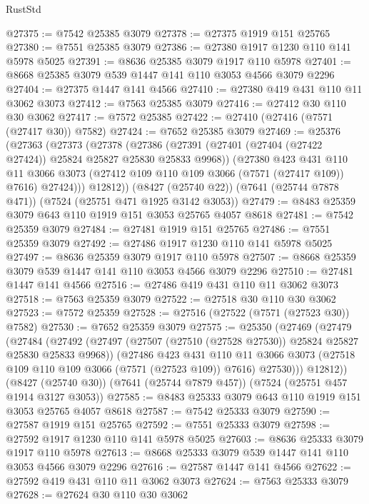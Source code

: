 \begin{lexlean}{RustStd}
\begin{coremodule}
@27375 := @7542 @25385 @3079
@27378 := @27375 @1919 @151 @25765
@27380 := @7551 @25385 @3079
@27386 := @27380 @1917 @1230 @110 @141 @5978 @5025
@27391 := @8636 @25385 @3079 @1917 @110 @5978
@27401 := @8668 @25385 @3079 @539 @1447 @141 @110 @3053 @4566 @3079 @2296
@27404 := @27375 @1447 @141 @4566
@27410 := @27380 @419 @431 @110 @11 @3062 @3073
@27412 := @7563 @25385 @3079
@27416 := @27412 @30 @110 @30 @3062
@27417 := @7572 @25385
@27422 := @27410 (@27416 (@7571 (@27417 @30)) @7582)
@27424 := @7652 @25385 @3079
@27469 := @25376
    (@27363
      (@27373
        (@27378
          (@27386
            (@27391 (@27401 (@27404 (@27422 @27424)) @25824 @25827 @25830 @25833 @9968))
            (@27380
              @423
              @431
              @110
              @11
              @3066
              @3073
              (@27412 @109 @110 @109 @3066 (@7571 (@27417 @109)) @7616)
              @27424)))
        @12812))
    (@8427 (@25740 @22))
    (@7641 (@25744 @7878 @471))
    (@7524 (@25751 @471 @1925 @3142 @3053))
@27479 := @8483 @25359 @3079 @643 @110 @1919 @151 @3053 @25765 @4057 @8618
@27481 := @7542 @25359 @3079
@27484 := @27481 @1919 @151 @25765
@27486 := @7551 @25359 @3079
@27492 := @27486 @1917 @1230 @110 @141 @5978 @5025
@27497 := @8636 @25359 @3079 @1917 @110 @5978
@27507 := @8668 @25359 @3079 @539 @1447 @141 @110 @3053 @4566 @3079 @2296
@27510 := @27481 @1447 @141 @4566
@27516 := @27486 @419 @431 @110 @11 @3062 @3073
@27518 := @7563 @25359 @3079
@27522 := @27518 @30 @110 @30 @3062
@27523 := @7572 @25359
@27528 := @27516 (@27522 (@7571 (@27523 @30)) @7582)
@27530 := @7652 @25359 @3079
@27575 := @25350
    (@27469
      (@27479
        (@27484
          (@27492
            (@27497 (@27507 (@27510 (@27528 @27530)) @25824 @25827 @25830 @25833 @9968))
            (@27486
              @423
              @431
              @110
              @11
              @3066
              @3073
              (@27518 @109 @110 @109 @3066 (@7571 (@27523 @109)) @7616)
              @27530)))
        @12812))
    (@8427 (@25740 @30))
    (@7641 (@25744 @7879 @457))
    (@7524 (@25751 @457 @1914 @3127 @3053))
@27585 := @8483 @25333 @3079 @643 @110 @1919 @151 @3053 @25765 @4057 @8618
@27587 := @7542 @25333 @3079
@27590 := @27587 @1919 @151 @25765
@27592 := @7551 @25333 @3079
@27598 := @27592 @1917 @1230 @110 @141 @5978 @5025
@27603 := @8636 @25333 @3079 @1917 @110 @5978
@27613 := @8668 @25333 @3079 @539 @1447 @141 @110 @3053 @4566 @3079 @2296
@27616 := @27587 @1447 @141 @4566
@27622 := @27592 @419 @431 @110 @11 @3062 @3073
@27624 := @7563 @25333 @3079
@27628 := @27624 @30 @110 @30 @3062

\end{coremodule}
\end{lexlean}
